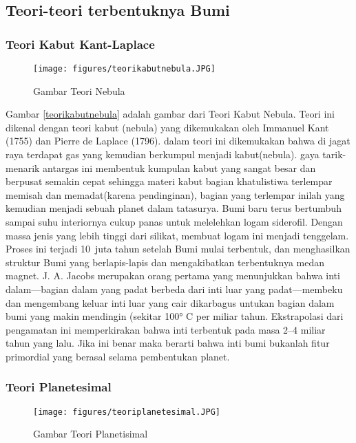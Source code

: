 \subsection{Teori-teori terbentuknya Bumi}
\subsubsection{Teori Kabut Kant-Laplace}
\begin{figure} [ht]
	\centerline{\texttt{[image: figures/teorikabutnebula.JPG]}}
	\caption{Gambar Teori Nebula}
	\label{teori kabut nebula}
	\end{figure}

Gambar \ref{teorikabutnebula} adalah gambar dari Teori Kabut Nebula. Teori ini dikenal dengan teori kabut (nebula) yang dikemukakan oleh Immanuel Kant (1755) dan Pierre de Laplace (1796). dalam teori ini dikemukakan bahwa di jagat raya terdapat gas yang kemudian berkumpul menjadi kabut(nebula). gaya tarik-menarik antargas ini membentuk kumpulan kabut yang sangat besar dan berpusat semakin cepat sehingga materi kabut bagian khatulistiwa terlempar memisah dan memadat(karena pendinginan), bagian yang terlempar inilah yang kemudian menjadi sebuah planet dalam tatasurya. Bumi baru terus bertumbuh sampai suhu interiornya cukup panas untuk melelehkan logam siderofil. Dengan massa jenis yang lebih tinggi dari silikat, membuat logam ini menjadi tenggelam. Proses ini terjadi 10 juta tahun setelah Bumi mulai terbentuk, dan menghasilkan struktur Bumi yang berlapis-lapis dan mengakibatkan terbentuknya medan magnet. J. A. Jacobs merupakan orang pertama yang menunjukkan bahwa inti dalam—bagian dalam yang padat berbeda dari inti luar yang padat—membeku dan mengembang keluar inti luar yang cair dikarbagus untukan bagian dalam bumi yang makin mendingin (sekitar 100° C per miliar tahun. Ekstrapolasi dari pengamatan ini memperkirakan bahwa inti terbentuk pada masa 2–4 miliar tahun yang lalu. Jika ini benar maka berarti bahwa inti bumi bukanlah fitur primordial yang berasal selama pembentukan planet.

\subsubsection{Teori Planetesimal}

\begin{figure} [ht]
	\centerline{\texttt{[image: figures/teoriplanetesimal.JPG]}}
	\caption{Gambar Teori Planetisimal}
	\label{teori planetesimal}
	\end{figure}


